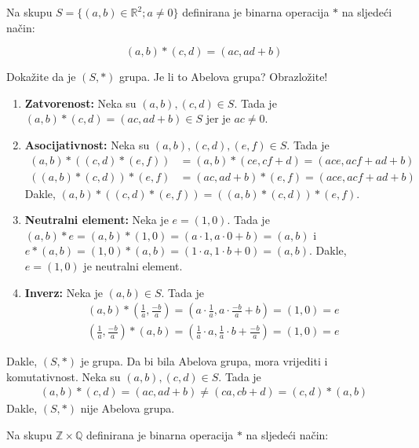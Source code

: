 \documentclass{exam}
\begin{document}
\begin{questions}
\question Na skupu $S = \{(a, b) \in \mathbb{R}^2; a \neq 0\}$ definirana je binarna operacija $*$ na sljedeći način:

\[
  (a, b) * (c, d) = (ac, ad + b)
\]

Dokažite da je $(S, *)$ grupa. Je li to Abelova grupa? Obrazložite!

\pagebreak

\begin{solution}
  \begin{enumerate}
    \item \textbf{Zatvorenost:} Neka su $(a, b), (c, d) \in S$. Tada je $(a, b) * (c, d) = (ac, ad + b) \in S$ jer je $ac \neq 0$.
    \item \textbf{Asocijativnost:} Neka su $(a, b), (c, d), (e, f) \in S$. Tada je
      \begin{align*}
        (a, b) * ((c, d) * (e, f)) &= (a, b) * (ce, cf + d) = (ace, acf + ad + b) \\
        ((a, b) * (c, d)) * (e, f) &= (ac, ad + b) * (e, f) = (ace, acf + ad + b)
      \end{align*}
      Dakle, $(a, b) * ((c, d) * (e, f)) = ((a, b) * (c, d)) * (e, f)$.
    \item \textbf{Neutralni element:} Neka je $e = (1, 0)$. Tada je $(a, b) * e = (a, b) * (1, 0) = (a \cdot 1, a \cdot 0 + b) = (a, b)$ i $e * (a, b) = (1, 0) * (a, b) = (1 \cdot a, 1 \cdot b + 0) = (a, b)$. Dakle, $e = (1, 0)$ je neutralni element.
    \item \textbf{Inverz:} Neka je $(a, b) \in S$. Tada je
      \begin{align*}
        (a, b) * \left(\frac{1}{a}, \frac{-b}{a}\right) = \left(a \cdot \frac{1}{a}, a \cdot \frac{-b}{a} + b\right) = (1, 0) = e \\
        \left(\frac{1}{a}, \frac{-b}{a}\right) * (a, b) = \left(\frac{1}{a} \cdot a, \frac{1}{a} \cdot b + \frac{-b}{a}\right) = (1, 0) = e
      \end{align*}
  \end{enumerate}
  Dakle, $(S, *)$ je grupa. Da bi bila Abelova grupa, mora vrijediti i komutativnost. Neka su $(a, b), (c, d) \in S$. Tada je
  \begin{align*}
    (a, b) * (c, d) = (ac, ad + b) \neq (ca, cb + d) = (c, d) * (a, b)
  \end{align*}
  Dakle, $(S, *)$ nije Abelova grupa.
\end{solution}

\question Na skupu $\mathbb{Z} \times \mathbb{Q}$ definirana je binarna operacija $*$ na sljedeći način:


\end{questions}
\end{document}

